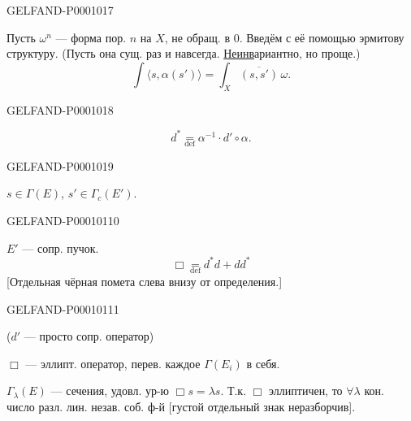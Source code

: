 \begin{GelfandAdjacentEvidence}{GELFAND-P000101}{7}


Пусть $\omega^n$ — форма пор. $n$ на $X$, не обращ. в $0$.
Введём с её помощью эрмитову структуру. (Пусть она
сущ. раз и навсегда. \underline{Неинв}ариантно, но проще.)
\begin{equation*}
\int\langle s,\alpha(s')\rangle=\int_X\overline{(s,s')}\,\omega.
\end{equation*}
\end{GelfandAdjacentEvidence}
\begin{GelfandAdjacentEvidence}{GELFAND-P000101}{8}

\begin{equation*}d^*\underset{\mathrm{def}}{=}\alpha^{-1}\cdot d'\circ\alpha.\end{equation*}
\end{GelfandAdjacentEvidence}
\begin{GelfandAdjacentEvidence}{GELFAND-P000101}{9}

$s\in\Gamma(E)$, $s'\in\Gamma_c(E')$.
\end{GelfandAdjacentEvidence}
\begin{GelfandAdjacentEvidence}{GELFAND-P000101}{10}


$E'$ — сопр. пучок.
\begin{equation*}\Box\underset{\mathrm{def}}{=}d^*d+dd^*\end{equation*}
[Отдельная чёрная помета слева внизу от определения.]
\end{GelfandAdjacentEvidence}
\begin{GelfandAdjacentEvidence}{GELFAND-P000101}{11}

($d'$ — просто сопр. оператор)

$\Box$ — эллипт. оператор, перев. каждое $\Gamma(E_i)$ в себя.

$\Gamma_\lambda(E)$ — сечения, удовл. ур-ю $\Box s=\lambda s$.
Т.к. $\Box$ эллиптичен, то $\forall\lambda$ кон. число разл. лин. незав. соб. ф-й
[густой отдельный знак неразборчив].
\end{GelfandAdjacentEvidence}
